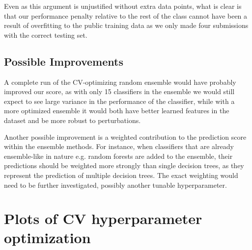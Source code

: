 \documentclass[10pt]{article}
\begin{document}
Even as this argument is unjustified without extra data points, what is clear is that our performance penalty relative to the rest of the class cannot have been a result of overfitting to the public training data as we only made four submissions with the correct testing set.

\subsection{Possible Improvements}

A complete run of the CV-optimizing random ensemble would have probably improved our score, as with only 15 classifiers in the ensemble we would still expect to see large variance in the performance of the classifier, while with a more optimized ensemble it would both have better learned features in the dataset and be more robust to perturbations.

Another possible improvement is a weighted contribution to the prediction score within the ensemble methods. For instance, when classifiers that are already ensemble-like in nature e.g. random forests are added to the ensemble, their predictions should be weighted more strongly than single decision trees, as they represent the prediction of multiple decision trees. The exact weighting would need to be further investigated, possibly another tunable hyperparameter.

\appendix

\section{Plots of CV hyperparameter optimization}
\end{document}
